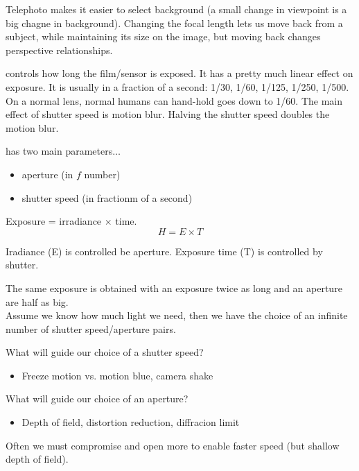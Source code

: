 \documentclass{article}
\begin{document}
\begin{remark}
  Telephoto makes it easier to select background (a small change in viewpoint is a big chagne in background). Changing the focal length lets us move back from a subject, while maintaining its size on the image, but moving back changes perspective relationships. 
\end{remark}

 controls how long the film/sensor is exposed. It has a pretty much linear effect on exposure. It is usually in a fraction of a second: 1/30, 1/60, 1/125, 1/250, 1/500. On a normal lens, normal humans can hand-hold goes down to 1/60. The main effect of shutter speed is motion blur. Halving the shutter speed doubles the motion blur. 

 has two main parameters$\dots$
\begin{itemize}
  \item aperture (in $f$ number)
  \item shutter speed (in fractionm of a second)
\end{itemize}
Exposure = irradiance $\times$ time. $$ H = E \times T$$ 

\begin{remark}
  Iradiance (E) is controlled be aperture. Exposure time (T) is controlled by shutter. 
\end{remark}

\begin{definition}[Reciprocity]
  The same exposure is obtained with an exposure twice as long and an aperture are half as big. \\ 
  Assume we know how much light we need, then we have the choice of an infinite number of shutter speed/aperture pairs. 
\end{definition}

\begin{remark}
  What will guide our choice of a shutter speed? 
  \begin{itemize}
    \item Freeze motion vs. motion blue, camera shake
  \end{itemize}
  What will guide our choice of an aperture? 
  \begin{itemize}
    \item Depth of field, distortion reduction, diffracion limit
  \end{itemize}
  Often we must compromise and open more to enable faster speed (but shallow depth of field). 
\end{remark}
\end{document}
